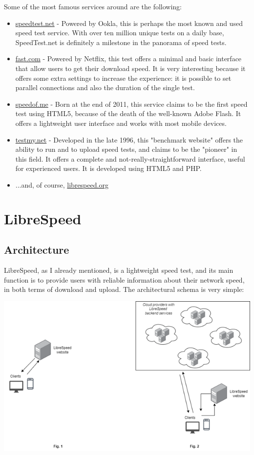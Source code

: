 \documentclass{article}
\begin{document}
Some of the most famous services around are the following:
\begin{itemize}
\item \href{https://speedtest.net}{speedtest.net} - Powered by Ookla, this is perhaps the most known and used speed test service. With over ten million unique tests on a daily base, SpeedTest.net is definitely a milestone in the panorama of speed tests.
\item \href{https://fast.com}{fast.com} - Powered by Netflix, this test offers a minimal and basic interface that allow users to get their download speed. It is very interesting because it offers some extra settings to increase the experience: it is possible to set parallel connections and also the duration of the single test.
\item \href{https://speedof.me}{speedof.me} - Born at the end of 2011, this service claims to be the first speed test using HTML5, because of the death of the well-known Adobe Flash. It offers a lightweight user interface and works with most mobile devices.
\item \href{https://testmy.net}{testmy.net} - Developed in the late 1996, this "benchmark website" offers the ability to run and to upload speed tests, and claims to be the "pioneer" in this field. It offers a complete and not-really-straightforward interface, useful for experienced users. It is developed using HTML5 and PHP.
\item ...and, of course, \href{librespeed.org}{librespeed.org}
\end{itemize}

\newpage
\section{LibreSpeed}
\subsection{Architecture}
LibreSpeed, as I already mentioned, is a lightweight speed test, and its main function is to provide users with reliable information about their network speed, in both terms of download and upload. The architectural schema is very simple:

\begin{center}
\begin{minipage}{12cm}
\includegraphics[width=\textwidth]{1-schema}
\end{minipage}
\end{center}
\end{document}
